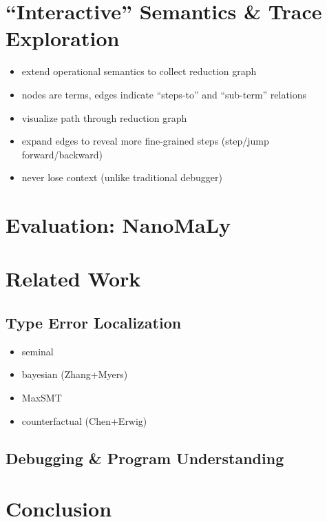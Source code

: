 \documentclass[pldi,indentedstyle=false]{sigplanconf-pldi15}
\begin{document}
\section{``Interactive'' Semantics \& Trace Exploration} %
\begin{itemize}
\item extend operational semantics to collect reduction graph
\item nodes are terms, edges indicate ``steps-to'' and ``sub-term'' relations
\item visualize path through reduction graph
\item expand edges to reveal more fine-grained steps (step/jump forward/backward)
\item never lose context (unlike traditional debugger)
\end{itemize}

\section{Evaluation: NanoMaLy}                %
\section{Related Work}              %

\subsection{Type Error Localization}
\label{sec:type-error-local}
\begin{itemize}
\item seminal
\item bayesian (Zhang+Myers)
\item MaxSMT
\item counterfactual (Chen+Erwig)
\end{itemize}
\subsection{Debugging \& Program Understanding}
\label{sec:debugging}



\section{Conclusion}                %
\end{document}
